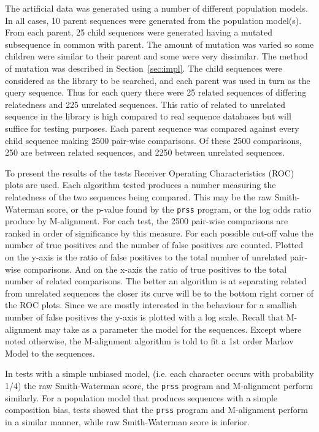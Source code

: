 \documentclass[letterpaper,11pt,oneside]{article}
\begin{document}
\begin{multicols}{2}
The artificial data was generated using a number of different population
models.  In all cases, 10 parent sequences were generated from the population
model(s). From
each parent, 25 child sequences were generated having a mutated
subsequence in common with parent.  The amount of mutation was varied so some
children were similar to their parent and some were very dissimilar.  The
method of mutation was described in Section~\ref{sec:impl}.
The child sequences were
considered as the library to be searched, and each parent was used in turn as
the query sequence.  Thus for each query there were 25 related sequences of
differing relatedness and 225 unrelated sequences.  This ratio of related to
unrelated sequence in the library is high compared to real sequence
databases but will suffice for testing purposes.  Each parent sequence was
compared against every child sequence making 2500 pair-wise comparisons.  Of
these 2500 comparisons, 250 are between related sequences, and 2250 between
unrelated sequences.

To present the results of the tests Receiver Operating Characteristics (ROC)
\cite{gribskov96,brenner98} plots are used.  Each algorithm tested produces
a number measuring the relatedness of the two sequences being compared.  This
may be the raw Smith-Waterman score, or the p-value found by the \verb!prss! 
program, or the log odds ratio produce by M-alignment.  For each test, the
2500 pair-wise comparisons are ranked in order of significance by this
measure.  For each possible cut-off value the number of true positives and the
number of false positives are counted.  Plotted on the y-axis is the ratio of
false positives to the total number of unrelated pair-wise comparisons.  And
on the x-axis the ratio of true positives to the total number of related
comparisons.  The better an algorithm is at separating related from unrelated
sequences the closer its curve will be to the bottom right corner of the ROC
plots.  Since we are mostly interested in the behaviour for a smallish number
of false positives the y-axis is plotted with a log scale.  Recall that
M-alignment may take as a parameter the model for the sequences.  Except where
noted otherwise, the M-alignment algorithm is told to fit a 1st order Markov
Model to the sequences.

In tests with a simple unbiased model, (i.e. each character occurs with
probability 1/4) the raw Smith-Waterman score, the \verb!prss! program and
M-alignment perform similarly.  For a population model that produces sequences
with a simple composition bias, tests showed that the \verb!prss! program and
M-alignment perform in a similar manner, while raw Smith-Waterman score is
inferior.


\end{multicols}
\end{document}
